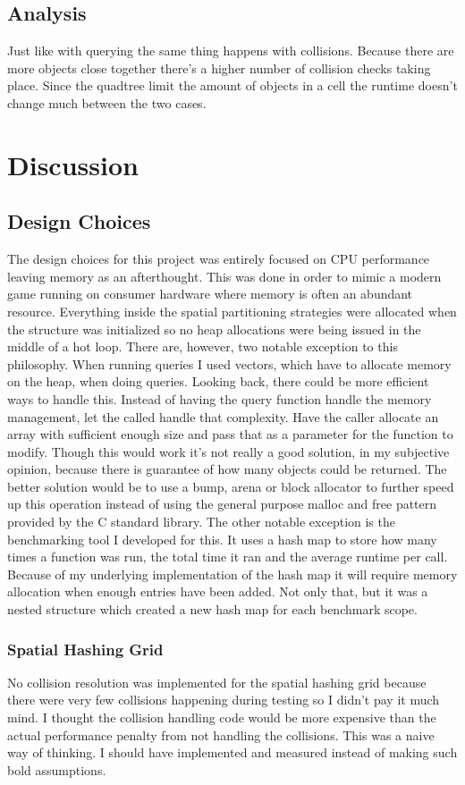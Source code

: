 \documentclass[a4paper, 12pt]{article}
\begin{document}
\subsection{Analysis}
Just like with querying the same thing happens with collisions. Because there
are more objects close together there's a higher number of collision checks
taking place. Since the quadtree limit the amount of objects in a cell the
runtime doesn't change much between the two cases.

\section{Discussion}

\subsection{Design Choices}
The design choices for this project was entirely focused on CPU performance
leaving memory as an afterthought. This was done in order to mimic a modern game
running on consumer hardware where memory is often an abundant resource.
Everything inside the spatial partitioning strategies were allocated when the
structure was initialized so no heap allocations were being issued in the middle
of a hot loop. There are, however, two notable exception to this philosophy.
When running queries I used vectors, which have to allocate memory on the heap,
when doing queries. Looking back, there could be more efficient ways to handle
this. Instead of having the query function handle the memory management, let the
called handle that complexity. Have the caller allocate an array with sufficient
enough size and pass that as a parameter for the function to modify. Though this
would work it's not really a good solution, in my subjective opinion, because
there is guarantee of how many objects could be returned. The better solution
would be to use a bump, arena or block allocator to further speed up this
operation instead of using the general purpose malloc and free pattern provided
by the C standard library. The other notable exception is the benchmarking tool
I developed for this. It uses a hash map to store how many times a function was
run, the total time it ran and the average runtime per call. Because of my
underlying implementation of the hash map it will require memory allocation when
enough entries have been added. Not only that, but it was a nested structure
which created a new hash map for each benchmark scope.

\subsubsection{Spatial Hashing Grid}
No collision resolution was implemented for the spatial hashing grid because
there were very few collisions happening during testing so I didn't pay it much
mind. I thought the collision handling code would be more expensive than the
actual performance penalty from not handling the collisions. This was a naive
way of thinking. I should have implemented and measured instead of making such
bold assumptions.
\end{document}
